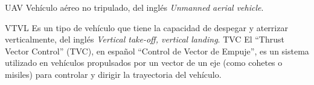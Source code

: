 {UAV}
{Vehículo aéreo no tripulado, del inglés \textit{Unmanned aerial vehicle}.}

{VTVL}
{Es un tipo de vehículo que tiene la capacidad de despegar y aterrizar verticalmente, del inglés \textit{Vertical take-off, vertical landing}.}
{TVC}
{El ``Thrust Vector Control'' (TVC), en español ``Control de Vector de Empuje'', es un sistema utilizado en vehículos propulsados por un vector de un eje (como cohetes o misiles) para controlar y dirigir la trayectoria del vehículo.}



